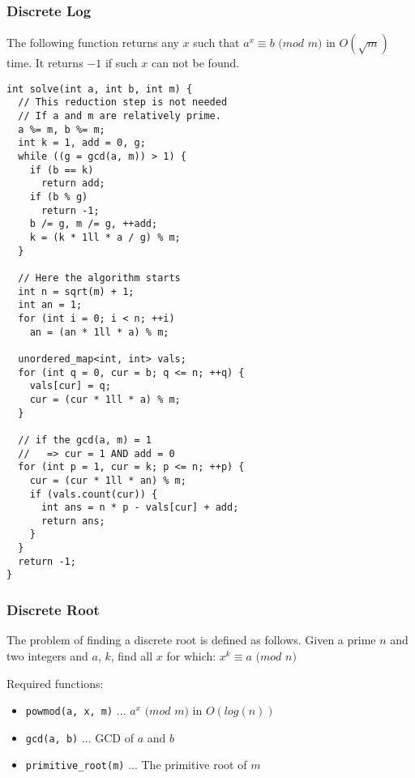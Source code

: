\begin{center}
\begin{minipage}[t]{0.45\linewidth}
\subsubsection{Discrete Log}

The following function returns any $x$ such that $a^x \equiv b$ $(mod$ $m)$ in $O(\sqrt{m})$ time.
It returns $-1$ if such $x$ can not be found. \cite{DiscreteLogCPAlgo}
  
\begin{lstlisting}
int solve(int a, int b, int m) {
  // This reduction step is not needed
  // If a and m are relatively prime.
  a %= m, b %= m;
  int k = 1, add = 0, g;
  while ((g = gcd(a, m)) > 1) {
    if (b == k)
      return add;
    if (b % g)
      return -1;
    b /= g, m /= g, ++add;
    k = (k * 1ll * a / g) % m;
  }

  // Here the algorithm starts
  int n = sqrt(m) + 1;
  int an = 1;
  for (int i = 0; i < n; ++i)
    an = (an * 1ll * a) % m;

  unordered_map<int, int> vals;
  for (int q = 0, cur = b; q <= n; ++q) {
    vals[cur] = q;
    cur = (cur * 1ll * a) % m;
  }

  // if the gcd(a, m) = 1
  //   => cur = 1 AND add = 0
  for (int p = 1, cur = k; p <= n; ++p) {
    cur = (cur * 1ll * an) % m;
    if (vals.count(cur)) {
      int ans = n * p - vals[cur] + add;
      return ans;
    }
  }
  return -1;
}
\end{lstlisting}
\end{minipage}
\qquad
\begin{minipage}[t]{0.45\linewidth}
\subsubsection{Discrete Root}

The problem of finding a discrete root is defined as follows.
Given a prime $n$ and two integers and $a$, $k$, find all $x$ for which:
$x^k \equiv a$ $(mod$ $n)$ \cite{DiscreteRootCPAlgo}

Required functions:
{
\begin{itemize}
  \item{\lstinline{powmod(a, x, m)} ... $a^x$ $(mod$ $m)$ in $O(log(n))$}
  \item{\lstinline{gcd(a, b)} ... GCD of $a$ and $b$}
  \item{\lstinline{primitive_root(m)} ... The primitive root of $m$}
\end{itemize}
}


\end{minipage}
\end{center}
